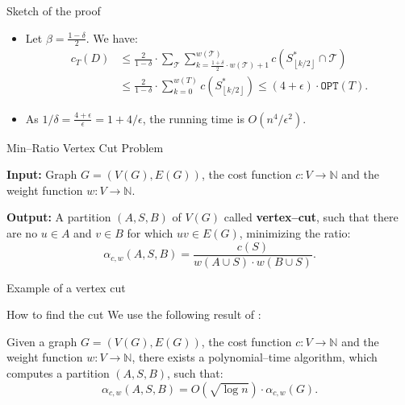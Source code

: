 \documentclass{beamer}
\newcommand{\br}[1]{\mathopen{}\left( #1 \right)}
\newcommand{\fl}[1]{\mathopen{}\left\lfloor #1 \right\rfloor}
\newcommand{\OPT}{\texttt{OPT}}
\begin{document}
\begin{frame}{Sketch of the proof}
    \begin{itemize}
        \item Let $\beta=\frac{1-\delta}{2}$. We have:
    \begin{align*}
            c_T\br{D} &\leq 
            \frac{2}{1-\delta}\cdot\sum_{\mathcal{T}}\sum_{k=\frac{1+\delta}{2}\cdot w\br{\mathcal{T}}+1}^{w\br{\mathcal{T}}}c\br{S_{\fl{k/2}}^*\cap \mathcal{T}}\\
            &\leq \frac{2}{1-\delta}\cdot\sum_{k=0}^{w\br{T}}c\br{S_{\fl{k/2}}^*}\leq  \br{4+\epsilon}\cdot\OPT\br{T}.
    \end{align*}
    \pause
    \item As $1/\delta=\frac{4+\epsilon}{\epsilon}=1+4/\epsilon$, the running time is $O\br{n^4/\epsilon^2}$.
    \end{itemize}
\end{frame}



\begin{frame}{Min–Ratio Vertex Cut Problem}

\begin{tcolorbox}[colback=white, title= Min–Ratio Vertex Cut Problem, fonttitle=\bfseries, breakable]
\textbf{Input:} Graph $G=\br{V\br{G}, E\br{G}}$, the cost function $c\colon V\to \mathbb{N}$ and the weight function $w\colon V\to \mathbb{N}$.

\textbf{Output:} A partition $\br{A,S,B}$ of $V\br{G}$ called \textbf{vertex–cut}, such that there are no $u\in A$ and $v\in B$ for which $uv\in E\br{G}$, minimizing the ratio:
$$
\alpha_{c,w}\br{A,S,B}=\frac{c\br{S}}{w\br{A\cup S}\cdot w\br{B\cup S}}.
$$
\end{tcolorbox}
\end{frame}


\begin{frame}{Example of a vertex cut}
    
\end{frame}

\begin{frame}{How to find the cut}
We use the following result of \cite{Improvedapproximationalgorithmsvertexseparators}:
\begin{theorem}\label{approxmrvc}
    Given a graph $G=\br{V\br{G}, E\br{G}}$, the cost function $c\colon V\to\mathbb{N}$ and the weight function $w\colon V\to \mathbb{N}$, there exists a
polynomial–time algorithm, which computes a partition $(A, S, B)$, such that:
$$
\alpha_{c,w}\br{A,S,B}=O\br{\sqrt{\log n
}}\cdot\alpha_{c,w}\br{G}.
$$
\end{theorem}
\end{frame}
\end{document}
